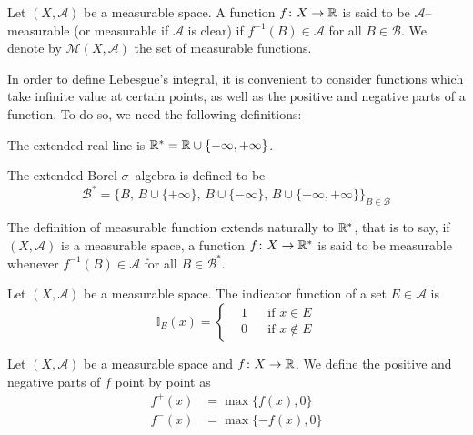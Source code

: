 \begin{definition*}
	Let $(X, \mathcal{A})$ be a measurable space. A function $f \colon X \to
	\mathbb{R}$ is said to be $\mathcal{A}$--measurable (or measurable if
	$\mathcal{A}$ is clear) if $f^{-1}(B) \in \mathcal{A}$ for all $B \in
	\mathcal{B}$. We denote by $\mathcal{M}(X, \mathcal{A})$ the set of
	measurable functions.
\end{definition*}

In order to define Lebesgue's integral, it is convenient to consider functions
which take infinite value at certain points, as well as the positive and
negative parts of a function. To do so, we need the following definitions:

\begin{definition*}
	\begin{enumeratedef}
		\item[]
		\item The extended real line is $\mathbb{R}^\ast = \mathbb{R} \cup \{-\infty, +\infty\}$.
		\item The extended Borel $\sigma$--algebra is defined to be
		\[
			\mathcal{B}^\ast = \{
			B, \, B \cup \{ + \infty \}, \, B \cup \{ - \infty \}, \, B \cup \{ -\infty, +\infty \}	
			\}_{B \in \mathcal{B}}
		\]
	\end{enumeratedef}
\end{definition*}

The definition of measurable function extends naturally to $\mathbb{R}^\ast$, that is
to say, if $(X, \mathcal{A})$ is a measurable space, a function $f \colon X
\rightarrow \mathbb{R}^\ast$ is said to be measurable whenever $f^{-1}(B) \in \mathcal{A}$
for all $B \in \mathcal{B}^\ast$.

\begin{definition*}
	Let $(X, \mathcal{A})$ be a measurable space. The indicator function of a
	set $E \in \mathcal{A}$ is 
	\[
		\mathbb{I}_E(x) = 
		\left\{
			\begin{aligned}
				&1	& &\text{if } x \in E 		\\
				&0	& &\text{if } x \not\in E
			\end{aligned}
		\right.
	\] 
\end{definition*}

\begin{definition*}
	Let $(X, \mathcal{A})$ be a measurable space and $f \colon X \rightarrow
	\mathbb{R}$. We define the positive and negative parts of $f$ point by point as
	\begin{align*}
		f^+(x) &= \max{\{ f(x), 0 \}} \\
		f^-(x) &= \max{\{ -f(x), 0 \}}
	\end{align*}
\end{definition*}


